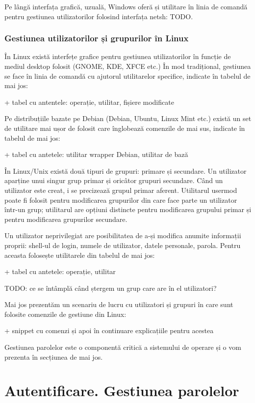 Pe lângă interfața grafică, uzuală, Windows oferă și utilitare în linia de
comandă pentru gestiunea utilizatorilor folosind interfața netsh: TODO.

\subsubsection{Gestiunea utilizatorilor și grupurilor în Linux}
\label{sec:users-ops-groups-linux}

În Linux există interfețe grafice pentru gestiunea utilizatorilor în funcție de
mediul desktop folosit (GNOME, KDE, XFCE etc.) În mod tradițional, gestiunea se
face în linia de comandă cu ajutorul utilitarelor specifice, indicate în tabelul
de mai jos:

+ tabel cu antentele: operație, utilitar, fișiere modificate

Pe distribuțiile bazate pe Debian (Debian, Ubuntu, Linux Mint etc.) există un
set de utilitare mai ușor de folosit care înglobează comenzile de mai sus,
indicate în tabelul de mai jos:

+ tabel cu antetele: utilitar wrapper Debian, utilitar de bază

În Linux/Unix există două tipuri de grupuri: primare și secundare. Un utilizator
aparține unui singur grup primar și oricâtor grupuri secundare. Când un
utilizator este creat, i se precizează grupul primar aferent. Utilitarul usermod
poate fi folosit pentru modificarea grupurilor din care face parte un utilizator
într-un grup; utilitarul are opțiuni distincte pentru modificarea grupului
primar și pentru modificarea grupurilor secundare.

Un utilizator neprivilegiat are posibilitatea de a-și modifica anumite
informații proprii: shell-ul de login, numele de utilizator, datele personale,
parola. Pentru aceasta folosește utilitarele din tabelul de mai jos:

+ tabel cu antetele: operație, utilitar

TODO: ce se întâmplă când ștergem un grup care are în el utilizatori?

Mai jos prezentăm un scenariu de lucru cu utilizatori și grupuri în care sunt
folosite comenzile de gestiune din Linux:

+ snippet cu comenzi și apoi în continuare explicațiile pentru acestea

Gestiunea parolelor este o componentă critică a sistemului de operare și o vom
prezenta în secțiunea de mai jos.

\section{Autentificare. Gestiunea parolelor}
\label{sec:users-auth}

